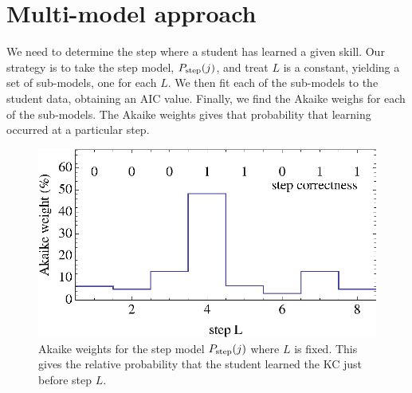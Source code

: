 \documentclass[11pt,letterpaper]{article}
\begin{document}
\section{Multi-model approach}
\label{multi-model}

We need to determine the step where a student has learned a given
skill.  Our strategy is to take the step model, $P_{\rm step}(j)$, 
and treat $L$ is a constant, yielding a set of sub-models, one for each $L$.
We then fit each of the sub-models to the student data, obtaining an
AIC value.  Finally, we find the Akaike weighs for each of the
sub-models.  The Akaike weights gives that probability that learning
occurred at a particular step.

\begin{figure}
  \centering \includegraphics{step-weights.eps}
   \caption{Akaike weights for the step model $P_{\rm step}(j)$
      where $L$ is fixed.  This gives the relative probability that
      the student learned the KC just before step $L$.}
    \label{step-weights}
\end{figure}
\end{document}

